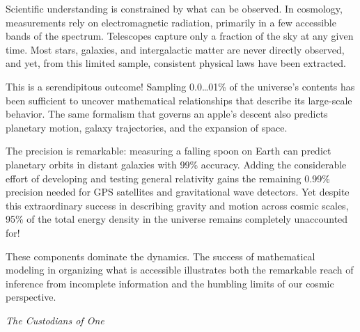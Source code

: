 \begin{commentary}
Scientific understanding is constrained by what can be observed. In cosmology, measurements rely on electromagnetic radiation, primarily in a few accessible bands of the spectrum. Telescopes capture only a fraction of the sky at any given time. Most stars, galaxies, and intergalactic matter are never directly observed, and yet, from this limited sample, consistent physical laws have been extracted.

This is a serendipitous outcome! Sampling 0.0\ldots01\% of the universe's contents has been sufficient to uncover mathematical relationships that describe its large-scale behavior. The same formalism that governs an apple's descent also predicts planetary motion, galaxy trajectories, and the expansion of space.

The precision is remarkable: measuring a falling spoon on Earth can predict planetary orbits in distant galaxies with 99\% accuracy. Adding the considerable effort of developing and testing general relativity gains the remaining 0.99\% precision needed for GPS satellites and gravitational wave detectors. Yet despite this extraordinary success in describing gravity and motion across cosmic scales, 95\% of the total energy density in the universe remains completely unaccounted for!

These components dominate the dynamics. The success of mathematical modeling in organizing what is accessible illustrates both the remarkable reach of inference from incomplete information and the humbling limits of our cosmic perspective.

\end{commentary}

\newpage
\thispagestyle{empty}

\begin{center}
\vspace*{0.25cm}
{\Large\textit{The Custodians of One}}
\vspace{0.25cm}
\end{center}


